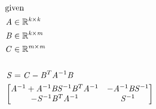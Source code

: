 \documentclass[12pt]{article}
\begin{document}
\begin{center}
\resizebox{\textwidth}{!} 
{
\begin{minipage}[c]{\textwidth}
\begin{align*}
\intertext{given} 
\mathit{A} & \in \mathbb{R}^{ \mathit{k} \times \mathit{k} } \\
\mathit{B} & \in \mathbb{R}^{ \mathit{k} \times \mathit{m} } \\
\mathit{C} & \in \mathbb{R}^{ \mathit{m} \times \mathit{m} } \\
\\
\mathit{S} & = \mathit{C} - {\mathit{B}}^T\mathit{A}^{-1}\mathit{B} \\
 \omit \span \begin{bmatrix}
\mathit{A}^{-1} + \mathit{A}^{-1}\mathit{B}\mathit{S}^{-1}{\mathit{B}}^T\mathit{A}^{-1} & -\mathit{A}^{-1}\mathit{B}\mathit{S}^{-1}\\
-\mathit{S}^{-1}{\mathit{B}}^T\mathit{A}^{-1} & \mathit{S}^{-1}\\
\end{bmatrix} \\
\end{align*}
\end{minipage}
}
\end{center}
\end{document}
